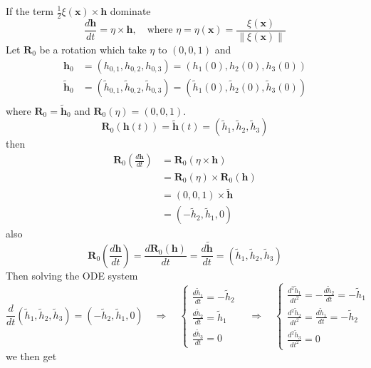 
If the term $\displaystyle \frac{1}{2}\xi(\textbf{x})\times\textbf{h}$ dominate 
\begin{equation}
\frac{d\textbf{h}}{dt} = \eta\times\textbf{h},
\quad\text{where }
\eta = \eta(\textbf{x}) = \frac{\xi(\textbf{x})}{\lVert\xi(\textbf{x})\rVert}
\end{equation}
Let $\textbf{R}_0$ be a rotation which take $\eta$ to $(0,0,1)$ and
\begin{equation}
\begin{aligned}
\textbf{h}_0 &= (h_{0,1}, h_{0,2}, h_{0,3}) = (h_{1}(0), h_{2}(0), h_{3}(0))\\
\widetilde{\textbf{h}}_0 &= (\widetilde{h}_{0,1}, \widetilde{h}_{0,2}, \widetilde{h}_{0,3}) = (\widetilde{h}_{1}(0), \widetilde{h}_{2}(0), \widetilde{h}_{3}(0))\\
\end{aligned}
\end{equation}
where $\textbf{R}_0 = \widetilde{\textbf{h}}_0$ and $\textbf{R}_0(\eta) = (0,0,1)$. 
\begin{equation}
\textbf{R}_0(\textbf{h}(t)) = \widetilde{\textbf{h}}(t) = \left(\widetilde{h}_1, \widetilde{h}_2, \widetilde{h}_3\right)
\end{equation}
then
\begin{equation}
\begin{aligned}
\textbf{R}_0\left(\frac{d\textbf{h}}{dt}\right)
&= \textbf{R}_0(\eta\times\textbf{h})\\
&=  \textbf{R}_0(\eta) \times \textbf{R}_0(\textbf{h})\\
&= (0,0,1)\times\widetilde{\textbf{h}}\\
&= (-\widetilde{h}_2, \widetilde{h}_1, 0)
\end{aligned}
\end{equation}
also
\begin{equation}
\textbf{R}_0\left(\frac{d\textbf{h}}{dt}\right)  = \frac{d\textbf{R}_0(\textbf{h})}{dt}
= \frac{d\widetilde{\textbf{h}}}{dt} = (\widetilde{h}_1, \widetilde{h}_2, \widetilde{h}_3)
\end{equation}
Then solving the ODE system
\begin{equation}
\frac{d}{dt}(\widetilde{h}_1, \widetilde{h}_2, \widetilde{h}_3) = (-\widetilde{h}_2, \widetilde{h}_1, 0)
\quad\Rightarrow\quad
\begin{cases}
\displaystyle \frac{d\widetilde{h}_1}{dt} = -\widetilde{h}_2\\
\displaystyle \frac{d\widetilde{h}_2}{dt} = \widetilde{h}_1\\
\displaystyle \frac{d\widetilde{h}_3}{dt} = 0
\end{cases}
\quad\Rightarrow\quad
\begin{cases}
\displaystyle \frac{d^2\widetilde{h}_1}{dt^2} = -\frac{d\widetilde{h}_2}{dt} = -\widetilde{h}_1\\
\displaystyle \frac{d^2\widetilde{h}_2}{dt^2} =  \frac{d\widetilde{h}_1}{dt} = - \widetilde{h}_2\\
\displaystyle \frac{d^2\widetilde{h}_3}{dt^2} = 0
\end{cases}
\end{equation}
we then get 






